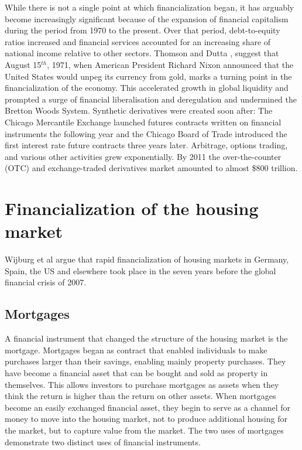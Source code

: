 While there is not a single point at which financialization began, it has arguably become increasingly significant because of the expansion of financial capitalism during the period from 1970 to the present. Over that period,  debt-to-equity ratios increased and financial services accounted for an increasing share of national income relative to other sectors. Thomson and Dutta \cite{thomsonFinancialisationPrimer2018}, suggest that August 15$^{th}$, 1971, when American President Richard Nixon announced that the United States would unpeg its currency from gold, marks a turning point in the financialization of the economy. This accelerated growth in global liquidity and prompted a surge of financial liberalisation and deregulation and undermined the Bretton Woods System. Synthetic derivatives were created soon after: The Chicago Mercantile Exchange launched futures contracts written on financial instruments the following year and the Chicago Board of Trade introduced the first interest rate future contracts three years later. Arbitrage, options trading, and various other activities grew exponentially. By 2011 the over-the-counter (OTC) and exchange-traded derivatives market amounted to almost \$800 trillion. 

\section{Financialization of the housing market}

Wijburg et al \cite{wijburgFinancialisationRentalHousing2018} argue that rapid financialization of housing markets in Germany, Spain, the US and elsewhere  took place in the seven years before the global financial crisis  of 2007. 




\subsection{Mortgages}

A financial instrument that changed the structure of the housing market is the mortgage. Mortgages began as contract that enabled individuals to make purchases larger than their savings, enabling mainly property purchases. They have become a financial asset that can be bought and sold as property in themselves. This allows investors to purchase mortgages as assets when they think the return is higher than the return on other assets.  When mortgages become an easily exchanged financial asset, they begin to serve as a channel for money to move into the housing market, not to produce additional housing for the market, but to capture value from the market. The two uses of mortgages demonstrate two distinct uses of financial instruments.  


